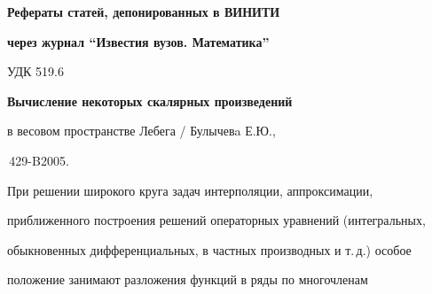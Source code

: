 

















\setcounter{page}{81}


\pagestyle{plain}










\par


{\centerline{\bf Рефераты статей, депонированных в ВИНИТИ}}





{\centerline{\bf через журнал ``Известия вузов. Математика''}}


\bigskip


\bigskip


{\hfill {УДК 519.6}}





{\bf Вычисление некоторых скалярных произведений


в весовом пространстве Лебега / Булычевa Е.Ю.,


\No\,429-B2005.}


\medskip





При решении широкого круга задач интерполяции, аппроксимации, 


приближенного построения решений операторных уравнений (интегральных,


обыкновенных дифференциальных, в частных производных и т.\,д.) особое


положение занимают разложения функций в ряды по многочленам


